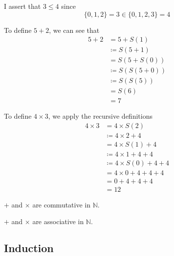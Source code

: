   \begin{example}[Order]
    I assert that $3 \leq 4$ since 
    \begin{equation}
      \{0, 1, 2\} = 3 \in \{0, 1, 2, 3 \} = 4
    \end{equation}
  \end{example}

  \begin{example}[Addition]
    To define $5 + 2$, we can see that 
    \begin{align}
      5 + 2 & = 5 + S(1) \\
            & \coloneqq S(5 + 1) \\
            & = S(5 + S(0)) \\
            & \coloneqq S(S(5 + 0)) \\
            & \coloneqq S(S(5)) \\
            & = S(6) \\
            & = 7
    \end{align}
  \end{example}

  \begin{example}[Multiplication]
    To define $4 \times 3$, we apply the recursive definitions 
    \begin{align}
      4 \times 3 & = 4 \times S(2) \\
                 & \coloneqq 4 \times 2 + 4 \\
                 & = 4 \times S(1) + 4 \\
                 & \coloneqq 4 \times 1 + 4 + 4 \\
                 & \coloneqq 4 \times S(0) + 4 + 4 \\
                 & = 4 \times 0 + 4 + 4 + 4 \\
                 & = 0 + 4 + 4 + 4 \\
                 & = 12
    \end{align}
  \end{example}

  \begin{theorem}[Commutative]
    $+$ and $\times$ are commutative in $\mathbb{N}$. 
  \end{theorem}

  \begin{theorem}[Associativity]
    $+$ and $\times$ are associative in $\mathbb{N}$. 
  \end{theorem}

\subsection{Induction}

